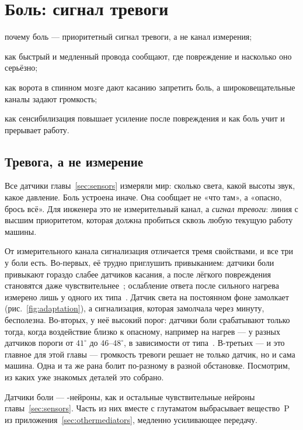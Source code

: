 \chapter{Боль: сигнал тревоги}
\label{sec:pain}
\begin{chaptergoals}
\item почему боль --- приоритетный сигнал тревоги, а не канал измерения;
\item как быстрый и медленный провода сообщают, где повреждение и насколько оно серьёзно;
\item как ворота в спинном мозге дают касанию запретить боль, а широковещательные каналы задают громкость;
\item как сенсибилизация повышает усиление после повреждения и как боль учит и прерывает работу.
\end{chaptergoals}

\section{Тревога, а не измерение}

Все датчики главы~\ref{sec:sensors} измеряли мир: сколько света, какой высоты звук, какое давление. Боль устроена иначе. Она сообщает не «что там», а «опасно, брось всё». Для инженера это не измерительный канал, а \emph{сигнал тревоги}: линия с высшим приоритетом, которая должна пробиться сквозь любую текущую работу машины.

От измерительного канала сигнализация отличается тремя свойствами, и все три у боли есть. Во-первых, её трудно приглушить привыканием: датчики боли привыкают гораздо слабее датчиков касания, а после лёгкого повреждения становятся даже чувствительнее~\cite{LaMotte1982hyper}; ослабление ответа после сильного нагрева измерено лишь у одного их типа~\cite{Treede1995heat}. Датчик света на постоянном фоне замолкает (рис.~\ref{fig:adaptation}), а сигнализация, которая замолчала через минуту, бесполезна. Во-вторых, у неё высокий порог: датчики боли срабатывают только тогда, когда воздействие близко к опасному, например на нагрев --- у разных датчиков пороги от $41^\circ$ до $46$--$48^\circ$, в зависимости от типа~\cite{Treede1995heat, Weidner1999cfib}. В-третьих --- и это главное для этой главы --- громкость тревоги решает не только датчик, но и сама машина. Одна и та же рана болит по-разному в разной обстановке. Посмотрим, из каких уже знакомых деталей это собрано.

Датчики боли --- -нейроны, как и остальные чувствительные нейроны главы~\ref{sec:sensors}. Часть из них вместе с глутаматом выбрасывает вещество~P из приложения~\ref{sec:othermediators}, медленно усиливающее передачу.

